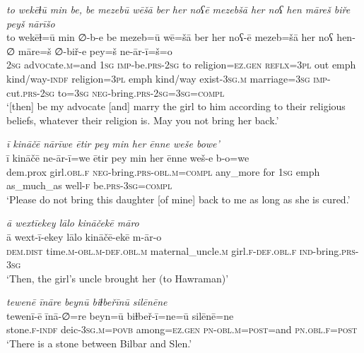 \ea \label{ZP.47}
\textit{to wekēɫū min be, be mezebū wēšā ber her noʕē mezebšā her noʕ hen māreš biře peyš nārīšo} \\ 
\gll to wekēɫ=ū min ∅-b-e be mezeb=ū wē=šā ber her noʕ-ē mezeb=šā her noʕ hen-∅ māre=š ∅-biř-e pey=š ne-ār-ī=š=o \\ 
 \textsc{2sg} ad\textsc{voc}ate\textsc{.m}=and \textsc{1sg} \textsc{imp-}be\textsc{.prs}-\textsc{2sg} to religion\textsc{\textsc{=ez.gen}} \textsc{reflx}\textsc{=3pl} out emph kind/way\textsc{-indf} religion\textsc{=3pl} emph kind/way exist\textsc{-3sg}\textsc{.m} marriage\textsc{=3sg} \textsc{imp-}cut\textsc{.prs}-\textsc{2sg} to\textsc{=3sg} \textsc{neg-}bring\textsc{.prs}\textsc{-2sg}\textsc{=3sg}\textsc{=compl} \\ 
\glt `[then] be my advocate [and] marry the girl to him according to their religious beliefs, whatever their religion is. May you not bring her back.'
\z 
 
\ea \label{ZP.48}
\textit{ī kināčē nārīwe ētir pey min her ēnne weše bowe’} \\ 
\gll ī kināčē ne-ār-ī=we ētir pey min her ēnne weš-e b-o=we \\ 
 dem.prox girl\textsc{.obl}\textsc{.f} \textsc{neg-}bring\textsc{.prs}\textsc{-obl}\textsc{.m}\textsc{=compl} any\_more for \textsc{1sg} emph as\_much\_as well\textsc{-f} be\textsc{.prs}\textsc{-3sg}\textsc{=compl} \\ 
\glt `Please do not bring this daughter [of mine] back to me as long as she is cured.'
\z 
 
\ea \label{ZP.49}
\textit{ā wextīekey lālo kināčekē māro} \\ 
\gll ā wext-ī-ekey lālo kināčē-ekē m-ār-o \\ 
 \textsc{dem.dist} time\textsc{.m}\textsc{-obl}\textsc{.m}\textsc{-def}\textsc{.obl}\textsc{.m} maternal\_uncle\textsc{.m} girl\textsc{.f}\textsc{-def}\textsc{.obl}\textsc{.f} \textsc{ind-}bring\textsc{.prs}\textsc{-3sg} \\ 
\glt `Then, the girl’s uncle brought her (to Hawraman)'
\z 
 
\ea \label{ZP.50}
\textit{tewenē īnāre beynū biɫbeřīnū silēnēne} \\ 
\gll tewenī-ē īnā-∅=re beyn=ū biɫbeř-ī=ne=ū silēnē=ne \\ 
 stone\textsc{.f}\textsc{-indf} deic\textsc{-3sg}\textsc{.m}\textsc{=\textsc{povb}} among\textsc{\textsc{=ez.gen}} \textsc{pn}\textsc{-obl}\textsc{.m}\textsc{=\textsc{post}}=and \textsc{pn}\textsc{.obl}\textsc{.f}\textsc{=\textsc{post}} \\ 
\glt `There is a stone between Bilbar and Slen.'
\z 
 
